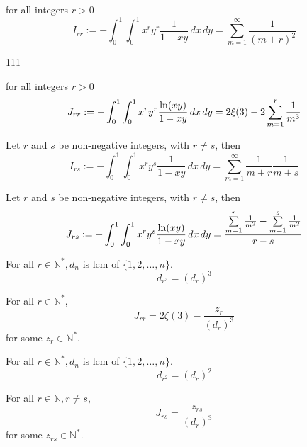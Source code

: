 \begin{lemma}\label{I_rr}
    for all integers $r > 0$
    \[ I_{rr} := -\int_{0}^{1}\int_{0}^{1} x^ry^r\frac{1}{1-xy} \, dx \, dy = \sum\limits_{m = 1}^{\infty}\frac{1}{(m+r)^2} \]
\end{lemma}

\begin{lemma}\label{interchange_of_limits_sums_derivatives}
    111
\end{lemma}

\begin{lemma}\label{J_rr}
    for all integers $r > 0$
    \[ J_{rr} := -\int_{0}^{1}\int_{0}^{1} x^ry^r\frac{{\rm ln}(xy)}{1-xy} \, dx \, dy = 2\xi(3) - 2 \sum\limits_{m = 1}^{r}\frac{1}{m^3} \]
\end{lemma}

\begin{lemma}\label{I_rs}
    Let $r$ and $s$ be non-negative integers, with $r \neq s$, then
    \[ I_{rs} := -\int_{0}^{1}\int_{0}^{1} x^ry^s\frac{1}{1-xy} \, dx \, dy = \sum\limits_{m = 1}^{\infty}\frac{1}{m+r}\frac{1}{m+s} \]
\end{lemma}

\begin{lemma}\label{J_rs}
    Let $r$ and $s$ be non-negative integers, with $r \neq s$, then
    \[ J_{rs} := -\int_{0}^{1}\int_{0}^{1} x^ry^s\frac{{\rm ln}(xy)}{1-xy} \, dx \, dy = \frac{\sum\limits_{m = 1}^{r}\frac{1}{m^2} - \sum\limits_{m = 1}^{s}\frac{1}{m^2}}{r - s} \]
\end{lemma}

\begin{lemma}\label{d_r_3}
    For all $r \in \mathbb{N}^*, d_n$ is lcm of $\{1, 2, \ldots, n\}.$ 
    \[ d_{r^3} = (d_r)^3 \]
\end{lemma}

\begin{lemma}\label{Jrr_linear_form}
    For all $r \in \mathbb{N}^*$,
    \[ J_{rr} = 2 \zeta(3) - \frac{z_r}{(d_r)^3} \]
    for some $z_r \in \mathbb{N}^*$.
\end{lemma}

\begin{lemma}\label{d_r_2}
    For all $r \in \mathbb{N}^*, d_n$ is lcm of $\{1, 2, \ldots, n\}.$ 
    \[ d_{r^2} = (d_r)^2 \]
\end{lemma}

\begin{lemma}\label{Jrs_postive_rational}
    For all $r \in \mathbb{N}, r \neq s$,
    \[ J_{rs} = \frac{z_{rs}}{(d_r)^3}\]
    for some $z_{rs} \in \mathbb{N}^*$.
\end{lemma}

